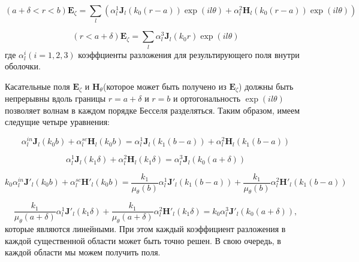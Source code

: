\documentclass[a4paper, 12pt]{article}
\begin{document}
\begin{equation}\label{e10}
	(a+\delta<r<b)\mathbf{E}_\zeta = \sum\limits_l (\alpha_l^{1} \mathbf{J}_l(k_0 (r-a))\exp(il\theta) +
								\alpha_l^{2} \mathbf{H}_l(k_0 (r-a))\exp(il\theta))
\end{equation}

\begin{equation*}
	(r<a+\delta)\mathbf{E}_\zeta = \sum\limits_l \alpha_l^{3} \mathbf{J}_l(k_0 r)\exp(il\theta)
\end{equation*}
где $\alpha_l^i(i=1,2,3)$ коэффциенты разложения для результирующего поля внутри оболочки.

Касательные поля $\mathbf{E}_\zeta$ и $\mathbf{H}_\theta$(которое может быть получено из $\mathbf{E}_\zeta$)
должны быть непрерывны вдоль границы $r=a+\delta$ и $r=b$ и ортогональность $\exp(il\theta)$ позволяет волнам
в каждом порядке Бесселя разделяться. Таким образом, имеем следущие четыре уравнения:

\begin{equation}\tag{11a}\label{e11a}
	\alpha_l^{in} \mathbf{J}_l(k_0 b) + \alpha_l^{sc} \mathbf{H}_l(k_0 b) = 
	\alpha_l^1 \mathbf{J}_l(k_1(b-a)) + \alpha_l^2 \mathbf{H}_l(k_1(b-a)) 	
\end{equation}

\begin{equation}\tag{11b}\label{e11b}
	\alpha_l^1 \mathbf{J}_l(k_1 \delta) + \alpha_l^2 \mathbf{H}_l(k_1 \delta) = \alpha_l^3 \mathbf{J}_l(k_0(a+\delta)) 
\end{equation}

\begin{equation}\tag{11c}\label{e11c}
	k_0\alpha_l^{in} \mathbf{J}'_l(k_0 b) + \alpha_l^{sc} \mathbf{H'}_l(k_0 b)	=
	\frac{k_1}{\mu_\theta(b)} \alpha_l^1 \mathbf{J'}_l(k_1(b-a)) + \frac{k_1}{\mu_\theta(b)} \alpha_l^2 \mathbf{H'}_l
	(k_1(b-a)) 	
\end{equation}

\begin{equation}\tag{11d}\label{e11d}
	\frac{k_1}{\mu_\theta(a+\delta)}\alpha_l^1 \mathbf{J'}_l(k_1 \delta) + \frac{k_1}{\mu_\theta(a+\delta)}
	\alpha_l^2 \mathbf{H'}_l(k_1 \delta) = k_0\alpha_l^3 \mathbf{J'}_l(k_0(a+\delta)),
\end{equation}
которые являются линейными. При этом каждый коэффициент разложения в каждой существенной области может быть точно решен.
В свою очередь, в каждой области мы можем получить поля.
\end{document}
